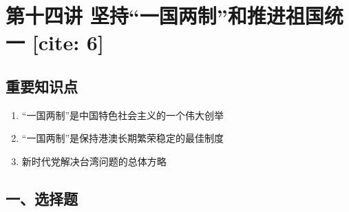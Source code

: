 \documentclass[a4paper,11pt]{ctexart}
\begin{document}
\newpage

\section{第十四讲 坚持“一国两制”和推进祖国统一 [cite: 6]}

\subsection{重要知识点}
\begin{enumerate}
    \item “一国两制”是中国特色社会主义的一个伟大创举
    \item “一国两制”是保持港澳长期繁荣稳定的最佳制度
    \item 新时代党解决台湾问题的总体方略
\end{enumerate}

\subsection{一、选择题}
\end{document}
